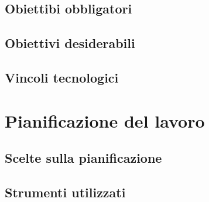    \subsection{Obiettibi obbligatori}

   \subsection{Obiettivi desiderabili}

   \subsection{Vincoli tecnologici}

\section{Pianificazione del lavoro}

   \subsection{Scelte sulla pianificazione}

   \subsection{Strumenti utilizzati}